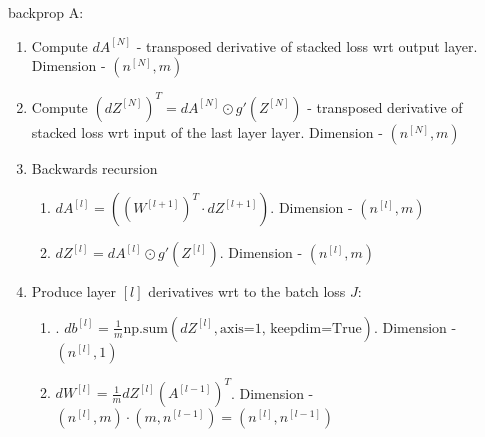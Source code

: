 \documentclass[10pt,a4paper]{article}
\begin{document}
backprop A:\\
\begin{enumerate}
\item Compute $dA^{[N]}$ - transposed derivative of stacked loss wrt output layer. Dimension -  $(n^{[N]}, m)$\\

\item Compute $(dZ^{[N]})^T=dA^{[N]}\odot g'(Z^{[N]})$ - transposed derivative of stacked loss wrt input of the last layer layer. Dimension -  $(n^{[N]}, m)$\\

\item Backwards recursion
\begin{enumerate}
\item  $  dA^{[l]}  =  ( (W^{[l+1]})^T \cdot dZ^{[l+1]} )   $.  Dimension -  $(n^{[l]}, m)$\\

\item  $  dZ^{[l]} =   dA^{[l]} \odot g'(Z^{[l]})   $.  Dimension -  $(n^{[l]}, m)$\\
 \end{enumerate} 
\item Produce layer $[l]$ derivatives wrt to the batch loss $J$:\\
\begin{enumerate}

\item. $db^{[l]} =   \frac{1}{m}\text{np.sum}(dZ^{[l]}, \text{axis=1, keepdim=True})$.   Dimension -  $(n^{[l]}, 1)$\\

\item $  dW^{[l]} = \frac{1}{m} dZ^{[l]}  (A^{[l-1]})^T$.  Dimension -  $(n^{[l]}, m) \cdot (m,n^{[l-1]}) =(n^{[l]}, n^{[l-1]})$\\
  \end{enumerate} 
 \end{enumerate} 

 









\end{document}
